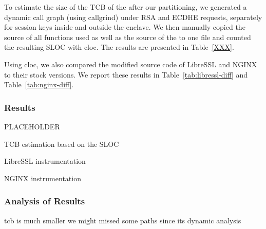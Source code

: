 \documentclass[../../../main.tex]{subfiles}
\begin{document}
\label{sec:tcb-analysis}
To estimate the size of the TCB of the \enclaveprogram after our partitioning, we generated a dynamic call graph (using callgrind) under RSA and ECDHE requests, separately for session keys inside and outside the enclave. We then manually copied the source of all functions used as well as the source of the \enclaveprogram to one file and counted the resulting SLOC with cloc. The results are presented in Table~\ref{XXX}.

Using cloc, we also compared the modified source code of LibreSSL and NGINX to their stock versions. We report these results in Table~\ref{tab:libressl-diff} and Table~\ref{tab:nginx-diff}.

\subsubsection*{Results}

\begin{table}[H]
  \center
  \footnotesize
  PLACEHOLDER
  \caption{TCB estimation based on the SLOC}
  \label{tab:tcb-estimate}
\end{table}

\begin{table}[H]
  \caption{LibreSSL instrumentation}
  \label{tab:libressl-diff}
\end{table}

\begin{table}[H]
  \caption{NGINX instrumentation}
  \label{tab:nginx-diff}
\end{table}

\subsubsection*{Analysis of Results}
tcb is much smaller
we might missed some paths since its dynamic analysis
\end{document}
